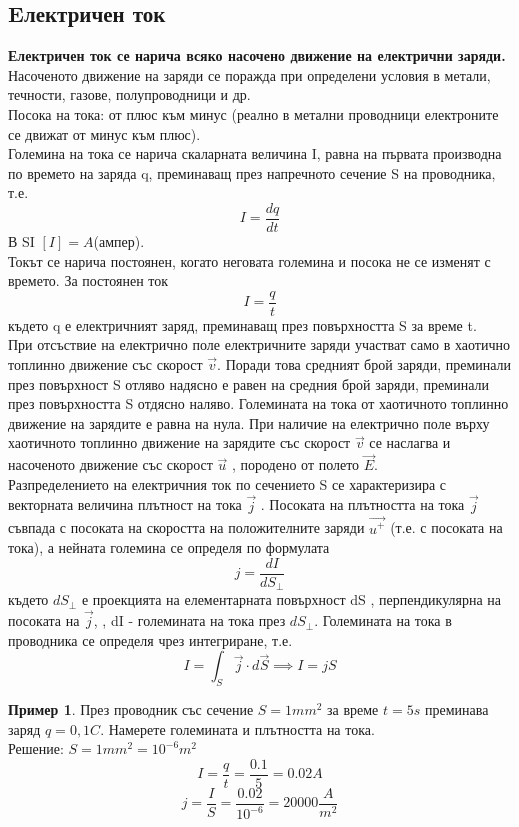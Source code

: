 \documentclass[fleqn, 12pt]{article}
\theoremstyle{definition}
\newtheorem{example}{Пример}[subsection]
\begin{document}
\subsection{Eлектричен ток}
\textbf{Електричен ток се нарича всяко насочено движение на електрични заряди.}\\
Насоченото движение на заряди се поражда при определени условия в метали,
течности, газове, полупроводници и др.\\
Посока на тока: от плюс към минус (реално в метални проводници електроните се
движат от минус към плюс).\\
Големина на тока се нарича скаларната величина I, равна на първата производна
по времето на заряда q, преминаващ през напречното сечение S на проводника, т.е. 
$$I = \frac{dq}{dt}$$
В SI $[I] = A $(ампер).\\
Токът се нарича постоянен, когато неговата големина и посока не се изменят с
времето. За постоянен ток 
$$I = \frac{q}{t}$$
където q е електричният заряд, преминаващ през повърхността S за време t.\\
При отсъствие на електрично поле електричните заряди участват само в
хаотично топлинно движение със скорост $\vec{v}$. 
Поради това средният брой заряди,
преминали през повърхност S отляво надясно е равен на средния брой заряди,
преминали през повърхността S отдясно наляво. Големината на тока от хаотичното
топлинно движение на зарядите е равна на нула. При наличие на електрично поле
върху хаотичното топлинно движение на зарядите със скорост $\vec{v}$ се наслагва и
насоченото движение със скорост $\vec{u}$ , породено от полето $\vec{E}$. \\
Разпределението на електричния ток по сечението S се характеризира с
векторната величина плътност на тока $\vec{j}$ . Посоката на плътността на тока $\vec{j}$ съвпада
с посоката на скоростта на положителните заряди $\vec{u^+}$ (т.е. с посоката на тока), а нейната
големина се определя по формулата
$$j = \frac{dI}{dS_\perp}$$
където $dS_\perp$  е проекцията на елементарната повърхност dS , перпендикулярна на
посоката на $\vec{j}$, , dI - големината на тока през $dS_\perp$.
Големината на тока в проводника се определя чрез интегриране, т.е. 
$$I = \int_S \vec{j} \cdot d \vec{S} \implies I = jS$$

\begin{example}
През проводник със сечение $S = 1mm^2$ за време $t = 5s$ преминава заряд
$q = 0,1C$. Намерете големината и плътността на тока. \\
Решение: $S = 1mm^2 = 10^{-6}m^2$\\
$$I = \frac{q}{t} = \frac{0.1}{5} = 0.02 A$$
$$j = \frac{I}{S} = \frac{0.02}{10^{-6}} = 20 000 \frac{A}{m^2}$$
\end{example}
\end{document}
